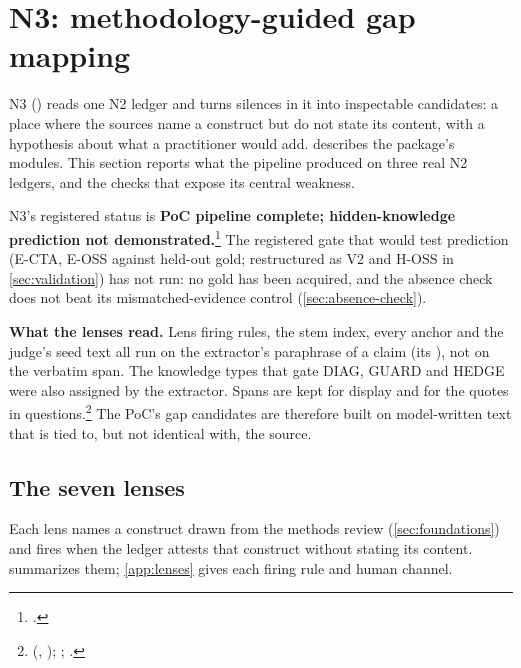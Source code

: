 \section{N3: methodology-guided gap mapping}
\label{sec:n3}

N3 () reads one N2 ledger and turns silences in it into inspectable candidates: a
place where the sources name a construct but do not state its content, with a hypothesis about what
a practitioner would add.  describes the package's modules. This section
reports what the pipeline produced on three real N2 ledgers, and the checks that expose its central
weakness.

\evobs{} N3's registered status is \textbf{PoC pipeline complete; hidden-knowledge prediction not
demonstrated.}\footnote{.} The registered gate that would test prediction (E-CTA,
E-OSS against held-out gold; restructured as V2 and H-OSS in \cref{sec:validation}) has not run: no gold has been acquired, and the absence check does not
beat its mismatched-evidence control (\cref{sec:absence-check}).

\textbf{What the lenses read.} \evobs{} Lens firing rules, the stem index, every anchor and the
judge's seed text all run on the extractor's paraphrase of a claim (its ), not on the
verbatim span. The knowledge types that gate DIAG, GUARD and HEDGE were also assigned by the
extractor. Spans are kept for display and for the quotes in questions.\footnote{
(, ); ;
.} The PoC's gap candidates are therefore built on model-written
text that is tied to, but not identical with, the source.

\subsection{The seven lenses}

Each lens names a construct drawn from the methods review (\cref{sec:foundations}) and fires when the
ledger attests that construct without stating its content.  summarizes them;
\cref{app:lenses} gives each firing rule and human channel.

